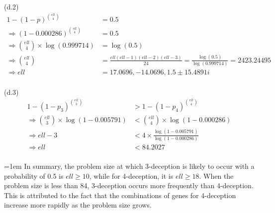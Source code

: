 \documentclass{article}
\begin{document}
\begin{enumerate}[label=(\alph*)]
            (d.2)
            \begin{equation*}
            \begin{aligned}
                  1 - (1 - p)^{ell \choose 4} &= 0.5 \\
                  \Rightarrow (1- 0.000286)^{ell \choose 4} &= 0.5 \\
                  \Rightarrow {ell \choose 4} \times \log(0.999714) &= \log(0.5) \\
                  \Rightarrow {ell \choose 4} &= \frac{ell(ell-1)(ell-2)(ell-3)}{24} = \frac{\log(0.5)}{\log(0.999714)} = 2423.24495 \\
                  \Rightarrow ell &= 17.0696, -14.0696, 1.5 \pm 15.4891i \\
            \end{aligned}
            \end{equation*}

            (d.3)
            \begin{equation*}
            \begin{aligned}
                  1 - (1 - p_3)^{ell \choose 3} &> 1 - (1 - p_4)^{ell \choose 4} \\
                  \Rightarrow {ell \choose 3} \times \log(1 - 0.005791) &< {ell \choose 4} \times \log(1 - 0.000286) \\
                  \Rightarrow ell - 3 &< 4 \times \frac{\log(1 - 0.005791)}{\log(1 - 0.000286)} \\
                  \Rightarrow ell &< 84.2027 \\
            \end{aligned}
            \end{equation*}

            \vspace{1.5em}
            \parindent=1em
            In summary, the problem size at which 3-deception is likely to occur with a probability of 0.5 is $ell \geq 10$, 
            while for 4-deception, it is $ell \geq 18$. When the problem size is less than 84, 
            3-deception occurs more frequently than 4-deception. 
            This is attributed to the fact that the combinations of genes for 4-deception increase more rapidly as the problem size grows.
            

\end{enumerate}
\end{document}
